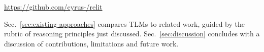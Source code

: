\documentclass[acmsmall,screen]{acmart}
\begin{document}
\begin{center}
\url{https://github.com/cyrus-/relit}
\end{center}

\noindent
Sec.~\ref{sec:existing-approaches} compares TLMs to related work, guided by the rubric of reasoning principles just discussed. 
Sec.~\ref{sec:discussion} concludes with a discussion of contributions, limitations and future work.

\end{document}
